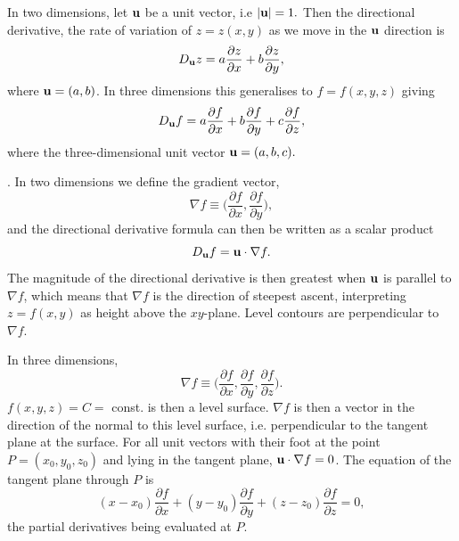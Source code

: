 \documentclass{article}
\begin{document}
%


\bigskip

 In two dimensions, let $\bf
u$ be a unit vector, i.e $|{\bf u}| = 1.$ Then the directional
derivative, the rate of variation of $z = z(x,y)$ as we move in
the $\bf u$ direction is
$$
D_{\bf u} z = a \frac{\partial z} {\partial x} +
b \frac{\partial z} {\partial y},
$$
where ${\bf u} = (a,b)$. In three dimensions this generalises to
$f=f(x,y,z)$ giving
$$ D_{\bf u} f = a \frac{\partial f} {\partial x} +
b \frac{\partial f} {\partial y} + c \frac{\partial f} {\partial
z} ,$$ where the three-dimensional unit vector ${\bf u} =
(a,b,c).$


\bigskip

. In two
dimensions we define the gradient vector,
$$
\nabla f \equiv \Bigr( \frac{\partial f} {\partial x},
\frac{\partial f} {\partial y} \Bigr),
$$
and the directional
derivative formula can then be written as a scalar product
$$
D_{\bf u} f = {\bf u} \cdot \nabla f.
$$
The magnitude of the
directional derivative is then greatest when $\bf u$ is parallel
to $\nabla f$, which means that $\nabla f$ is the direction of
steepest ascent, interpreting $z=f(x,y)$ as height above the
$xy$-plane. Level contours are perpendicular to $\nabla f$.

In three dimensions,
$$
\nabla f \equiv \Bigr(\frac{\partial f} {\partial x},
\frac{\partial f} {\partial y}, \frac{\partial f} {\partial z}
\Bigr).
$$
$f(x,y,z)=C=$ const. is then a level surface. $\nabla
f$ is then a vector in the direction of the normal to this level
surface, i.e. perpendicular to the tangent plane at the surface.
For all unit vectors with their foot at the point $P =
(x_0,y_0,z_0)$ and lying in the tangent plane, ${\bf u} \cdot
\nabla f = 0$. The equation of the tangent plane through $P$ is
$$
(x-x_0) \frac{\partial f} {\partial x}
+(y-y_0) \frac{\partial f} {\partial y} + (z-z_0) \frac{\partial
f} {\partial z}=0,
$$
the partial derivatives being evaluated at $P$.
\end{document}

